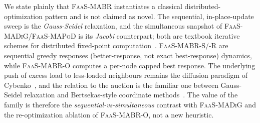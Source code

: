 We state plainly that \textsc{FaaS-MABR} instantiates a classical
distributed-optimization pattern and is not claimed as novel. The sequential,
in-place-update sweep is the \emph{Gauss-Seidel} relaxation, and the simultaneous
snapshot of \textsc{FaaS-MADiG}/\textsc{FaaS-MAPoD} is its \emph{Jacobi}
counterpart; both are textbook iterative schemes for distributed fixed-point
computation~\citep{bertsekastsitsiklis1989}. \textsc{FaaS-MABR-S}/\textsc{-R} are
sequential greedy responses (better-response, not exact best-response) dynamics,
while \textsc{FaaS-MABR-O} computes a per-node capped best response. The
underlying push of excess load to less-loaded neighbours remains the diffusion
paradigm of Cybenko~\citep{cybenko1989}, and the relation to the auction is the
familiar one between Gauss-Seidel relaxation and Bertsekas-style coordinate
methods~\citep{bertsekas1988}. The value of the family is therefore the
\emph{sequential-vs-simultaneous} contrast with \textsc{FaaS-MADiG} and the
re-optimization ablation of \textsc{FaaS-MABR-O}, not a new heuristic.
